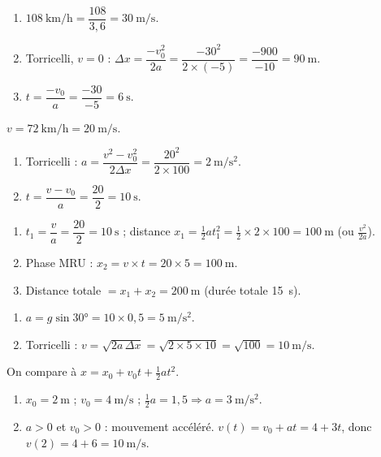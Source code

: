 \documentclass[11pt,a4paper]{article}
\begin{document}

\begin{corrige}
\begin{enumerate}[label=\alph*)]
  \item $\qty{108}{\kilo\metre\per\hour}=\dfrac{108}{3{,}6}=\qty{30}{\metre\per\second}$.
  \item Torricelli, $v=0$ : $\Delta x=\dfrac{-v_0^2}{2a}=\dfrac{-30^2}{2\times(-5)}=\dfrac{-900}{-10}=\qty{90}{\metre}$.
  \item $t=\dfrac{-v_0}{a}=\dfrac{-30}{-5}=\qty{6}{\second}$.
\end{enumerate}
\end{corrige}

\begin{corrige}
$v=\qty{72}{\kilo\metre\per\hour}=\qty{20}{\metre\per\second}$.
\begin{enumerate}[label=\alph*)]
  \item Torricelli : $a=\dfrac{v^2-v_0^2}{2\Delta x}=\dfrac{20^2}{2\times100}=\qty{2}{\metre\per\second\squared}$.
  \item $t=\dfrac{v-v_0}{a}=\dfrac{20}{2}=\qty{10}{\second}$.
\end{enumerate}
\end{corrige}

\begin{corrige}
\begin{enumerate}[label=\alph*)]
  \item $t_1=\dfrac{v}{a}=\dfrac{20}{2}=\qty{10}{\second}$ ; distance $x_1=\tfrac12 a t_1^2=\tfrac12\times2\times100=\qty{100}{\metre}$ (ou $\tfrac{v^2}{2a}$).
  \item Phase MRU : $x_2=v\times t=20\times5=\qty{100}{\metre}$.
  \item Distance totale $=x_1+x_2=\qty{200}{\metre}$ (durée totale \qty{15}{\second}).
\end{enumerate}
\end{corrige}

\begin{corrige}
\begin{enumerate}[label=\alph*)]
  \item $a=g\sin\ang{30}=10\times0{,}5=\qty{5}{\metre\per\second\squared}$.
  \item Torricelli : $v=\sqrt{2a\,\Delta x}=\sqrt{2\times5\times10}=\sqrt{100}=\qty{10}{\metre\per\second}$.
\end{enumerate}
\end{corrige}

\begin{corrige}
On compare à $x=x_0+v_0t+\tfrac12 a t^2$.
\begin{enumerate}[label=\alph*)]
  \item $x_0=\qty{2}{\metre}$ ; $v_0=\qty{4}{\metre\per\second}$ ; $\tfrac12 a=1{,}5 \Rightarrow a=\qty{3}{\metre\per\second\squared}$.
  \item $a>0$ et $v_0>0$ : mouvement accéléré. $v(t)=v_0+at=4+3t$, donc $v(2)=4+6=\qty{10}{\metre\per\second}$.
\end{enumerate}
\end{corrige}
\end{document}
